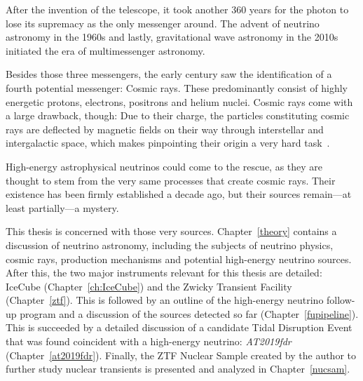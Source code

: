 After the invention of the telescope, it took another 360 years for the photon to lose its supremacy as the only messenger around. The advent of neutrino astronomy in the 1960s and lastly, gravitational wave astronomy in the 2010s initiated the era of multimessenger astronomy.

Besides those three messengers, the early  century saw the identification of a fourth potential messenger: Cosmic rays. These predominantly consist of highly energetic protons, electrons, positrons and helium nuclei. Cosmic rays come with a large drawback, though: Due to their charge, the particles constituting cosmic rays are deflected by magnetic fields on their way through interstellar and intergalactic space, which makes pinpointing their origin a very hard task~\cite{Beckman2021}.

High-energy astrophysical neutrinos could come to the rescue, as they are thought to stem from the very same processes that create cosmic rays. Their existence has been firmly established a decade ago, but their sources remain---at least partially---a mystery.

This thesis is concerned with those very sources. Chapter~\ref{theory} contains a discussion of neutrino astronomy, including the subjects of neutrino physics, cosmic rays, production mechanisms and potential high-energy neutrino sources. After this, the two major instruments relevant for this thesis are detailed: IceCube (Chapter~\ref{ch:IceCube}) and the Zwicky Transient Facility (Chapter~\ref{ztf}). This is followed by an outline of the high-energy neutrino follow-up program and a discussion of the sources detected so far (Chapter~\ref{fupipeline}). This is succeeded by a detailed discussion of a candidate Tidal Disruption Event that was found coincident with a high-energy neutrino: \textit{AT2019fdr} (Chapter~\ref{at2019fdr}). Finally, the ZTF Nuclear Sample created by the author to further study nuclear transients is presented and analyzed in Chapter~\ref{nucsam}.